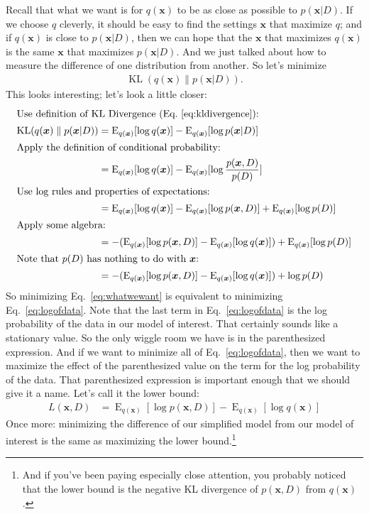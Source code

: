 \documentclass[12pt]{article}
\newcommand{\KL}{\operatorname{KL}}
\newcommand{\E}{\operatorname{E}}
\begin{document}
Recall that what we want is for $q(\bm{x})$ to be as close as possible to
$p(\bm{x}|D)$.  If we choose $q$ cleverly, it should be easy to find the
settings $\bm{x}$ that maximize $q$; and if $q(\bm{x})$ is close to
$p(\bm{x}|D)$, then we can hope that the $\bm{x}$ that maximizes $q(\bm{x})$ is
the same $\bm{x}$ that maximizes $p(\bm{x}|D)$.  And we just talked about how to
measure the difference of one distribution from another.  So let's minimize
\begin{align}\label{eq:whatwewant}
    \KL(q(\bm{x})\parallel p(\bm{x}|D)).
\end{align}
This looks interesting; let's look a little closer:
\begin{align}
    \intertext{Use definition of KL Divergence (Eq.~\ref{eq:kldivergence}):}
    \KL(q(\bm{x})\parallel p(\bm{x}|D))
    &= \E_{q(\bm{x})}[\log q(\bm{x})] - \E_{q(\bm{x})}[\log p(\bm{x}|D)]
    \nonumber \\
    \intertext{Apply the definition of conditional probability:}
    &= \E_{q(\bm{x})}[\log q(\bm{x})] - \E_{q(\bm{x})}[\log
    \frac{p(\bm{x},D)}{p(D)}]
    \nonumber \\
    \intertext{Use log rules and properties of expectations:}
    &= \E_{q(\bm{x})}[\log q(\bm{x})] - \E_{q(\bm{x})}[\log
    p(\bm{x},D)] + \E_{q(\bm{x})}[\log p(D)]
    \nonumber \\
    \intertext{Apply some algebra:}
    &=  - (\E_{q(\bm{x})}[\log
    p(\bm{x},D)] - \E_{q(\bm{x})}[\log q(\bm{x})]) + \E_{q(\bm{x})}[\log p(D)]
    \nonumber \\
    \intertext{Note that $p(D)$ has nothing to do with $\bm{x}$:}
    \label{eq:logofdata}
    &=  - (\E_{q(\bm{x})}[\log
    p(\bm{x},D)] - \E_{q(\bm{x})}[\log q(\bm{x})]) + \log p(D)
\end{align}
So minimizing Eq.~\ref{eq:whatwewant} is equivalent to minimizing
Eq.~\ref{eq:logofdata}.  Note that the last term in Eq.~\ref{eq:logofdata} is
the log probability of the data in our model of interest.  That certainly sounds
like a stationary value.  So the only wiggle room we have is in the
parenthesized expression.  And if we want to minimize all of
Eq.~\ref{eq:logofdata}, then we want to maximize the effect of the parenthesized
value on the term for the log probability of the data.  That parenthesized
expression is important enough that we should give it a name.  Let's call it the
lower bound:
\begin{align}\label{eq:lowerbound}
    L(\bm{x},D) &= \E_{q(\bm{x})}[\log p(\bm{x},D)]
    - \E_{q(\bm{x})}[\log q(\bm{x})]
\end{align}
Once more:  minimizing the difference of our simplified model from our model of
interest is the same as maximizing the lower bound.\footnote{And if you've been
paying especially close attention, you probably noticed that the lower bound is
the negative KL divergence of $p(\bm{x},D)$ from $q(\bm{x})$.}
\end{document}

